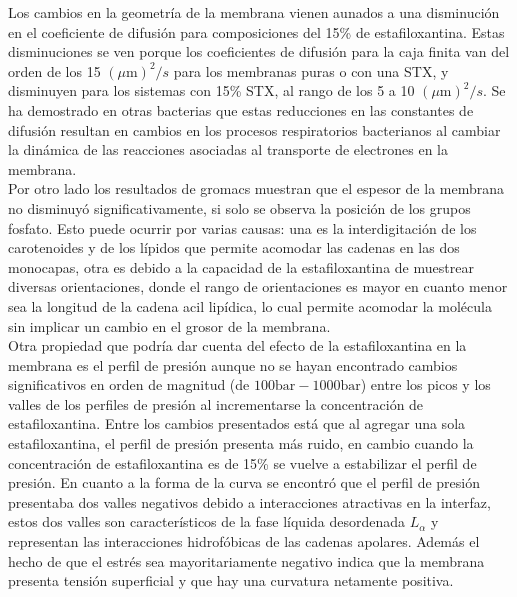 Los cambios en la geometr\'{i}a de la membrana vienen aunados a una disminuci\'{o}n en el coeficiente de difusi\'{o}n para composiciones del 15\% de estafiloxantina. Estas disminuciones se ven porque los coeficientes de difusi\'{o}n para la caja finita van del orden de los 15 $(\mu \mathrm{m})^2/s$ para los membranas puras o con una STX, y disminuyen para los sistemas con 15\% STX, al rango de los  5 a 10 $(\mu \mathrm{m})^2/s$. Se ha demostrado en otras bacterias que estas reducciones en las constantes de difusi\'{o}n resultan en cambios en los procesos respiratorios bacterianos al cambiar la din\'{a}mica de las reacciones asociadas al transporte de electrones en la membrana.\\

Por otro lado los resultados de gromacs muestran que el espesor de la membrana no disminuy\'{o} significativamente, si solo se observa la posici\'{o}n de los grupos fosfato. Esto puede ocurrir por varias causas: una es la interdigitaci\'{o}n de los carotenoides y de los l\'{i}pidos que permite acomodar las cadenas en las dos monocapas, otra es debido a  la capacidad de la estafiloxantina de muestrear diversas orientaciones, donde el rango de orientaciones es mayor en cuanto menor sea la longitud de la cadena acil lip\'{i}dica, lo cual permite acomodar la mol\'{e}cula sin implicar un cambio en el grosor de la membrana.\\

Otra propiedad que podr\'{i}a dar cuenta del efecto de la estafiloxantina en la membrana es el perfil de presi\'{o}n aunque no se hayan encontrado cambios significativos en orden de magnitud (de $100\mathrm{bar}-1000\mathrm{bar}$) entre los picos y los valles de los perfiles de presi\'{o}n al incrementarse la concentraci\'{o}n de estafiloxantina. Entre los cambios presentados est\'{a} que al agregar una sola estafiloxantina, el perfil de presi\'{o}n presenta m\'{a}s ruido, en cambio cuando la concentraci\'{o}n de estafiloxantina es de 15\% se vuelve a estabilizar el perfil de presi\'{o}n. En cuanto a la forma de la curva se encontr\'{o} que el perfil de presi\'{o}n presentaba dos valles negativos debido a interacciones atractivas en la interfaz, estos dos valles son caracter\'{i}sticos de la fase l\'{i}quida desordenada $L_{\alpha}$ y representan las interacciones hidrof\'{o}bicas de las cadenas apolares. Adem\'{a}s el hecho de que el estr\'{e}s sea mayoritariamente negativo indica que la membrana presenta tensi\'{o}n superficial y que hay una curvatura netamente positiva.\\

